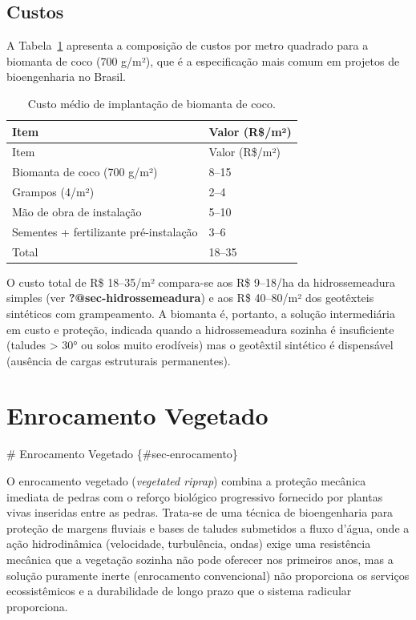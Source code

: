 \documentclass[
  portuguese,
  11pt,
  a4paper,
  open=any]{scrbook}
\begin{document}
\section{Custos}\label{custos-2}

A Tabela~\ref{tbl-custos-biomanta} apresenta a composição de custos por
metro quadrado para a biomanta de coco (700 g/m²), que é a especificação
mais comum em projetos de bioengenharia no Brasil.

\begin{longtable}[]{@{}ll@{}}
\caption{Custo médio de implantação de biomanta de
coco.}\label{tbl-custos-biomanta}\tabularnewline
\toprule\noalign{}
Item & Valor (R\$/m²) \\
\midrule\noalign{}
\endfirsthead
\toprule\noalign{}
Item & Valor (R\$/m²) \\
\midrule\noalign{}
\endhead
\bottomrule\noalign{}
\endlastfoot
Biomanta de coco (700 g/m²) & 8--15 \\
Grampos (4/m²) & 2--4 \\
Mão de obra de instalação & 5--10 \\
Sementes + fertilizante pré-instalação & 3--6 \\
Total & 18--35 \\
\end{longtable}

O custo total de R\$ 18--35/m² compara-se aos R\$ 9--18/ha da
hidrossemeadura simples (ver \textbf{?@sec-hidrossemeadura}) e aos R\$
40--80/m² dos geotêxteis sintéticos com grampeamento. A biomanta é,
portanto, a solução intermediária em custo e proteção, indicada quando a
hidrossemeadura sozinha é insuficiente (taludes \textgreater{} 30° ou
solos muito erodíveis) mas o geotêxtil sintético é dispensável (ausência
de cargas estruturais permanentes).

\chapter{Enrocamento Vegetado}\label{enrocamento-vegetado}

\# Enrocamento Vegetado \{\#sec-enrocamento\}

O enrocamento vegetado (\emph{vegetated riprap}) combina a proteção
mecânica imediata de pedras com o reforço biológico progressivo
fornecido por plantas vivas inseridas entre as pedras. Trata-se de uma
técnica de bioengenharia para proteção de margens fluviais e bases de
taludes submetidos a fluxo d'água, onde a ação hidrodinâmica
(velocidade, turbulência, ondas) exige uma resistência mecânica que a
vegetação sozinha não pode oferecer nos primeiros anos, mas a solução
puramente inerte (enrocamento convencional) não proporciona os serviços
ecossistêmicos e a durabilidade de longo prazo que o sistema radicular
proporciona.
\end{document}
